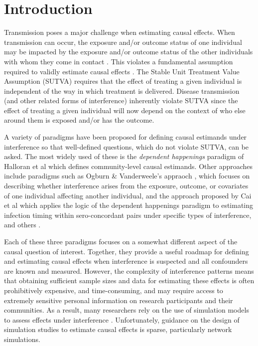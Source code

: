 \documentclass{article}
\theoremstyle{definition}
\begin{document}
\newpage


\section{Introduction}
Transmission poses a major challenge when estimating causal effects. When transmission can occur, the exposure and/or outcome status of one individual may be impacted by the exposure and/or outcome status of the other individuals with whom they come in contact \cite{halloran_dependent_2016}. This violates a fundamental assumption required to validly estimate causal effects \cite{halloran_study_1991}. The Stable Unit Treatment Value Assumption (SUTVA) requires that the effect of treating a given individual is independent of the way in which treatment is delivered. Disease transmission (and other related forms of interference) inherently violate SUTVA since the effect of treating a given individual will now depend on the context of who else around them is exposed and/or has the outcome. 

A variety of paradigms have been proposed for defining causal estimands under interference so that well-defined questions, which do not violate SUTVA, can be asked. The most widely used of these is the \emph{dependent happenings} paradigm of Halloran et al  \cite{halloran_study_1991} which defines community-level causal estimands. Other approaches include paradigms such as Ogburn \& Vanderweele's appraoch \cite{ogburn_causal_2014}, which focuses on describing whether interference arises from the exposure, outcome, or covariates of one individual affecting another individual, and the approach proposed by Cai et al \cite{cai_causal_2021} which applies the logic of the dependent happenings paradigm to estimating infection timing within sero-concordant pairs under specific types of interference, and others \cite{forastiere_identification_2021,savje_average_2021}. 

Each of these three paradigms focuses on a somewhat different aspect of the causal question of interest. Together, they provide a useful roadmap for defining and estimating causal effects when interference is suspected and all confounders are known and measured. However, the complexity of interference patterns means that obtaining sufficient sample sizes and data for estimating these effects is often prohibitively expensive, and time-consuming, and may require access to extremely sensitive personal information on research participants and their communities. As a result, many researchers rely on the use of simulation models to assess effects under interference \cite{murray_emulating_2021, buchanan_disseminated_2021,forastiere_identification_2021,buchanan_methods_2023}. Unfortunately, guidance on the design of simulation studies to estimate causal effects is sparse, particularly network simulations.
\end{document}
